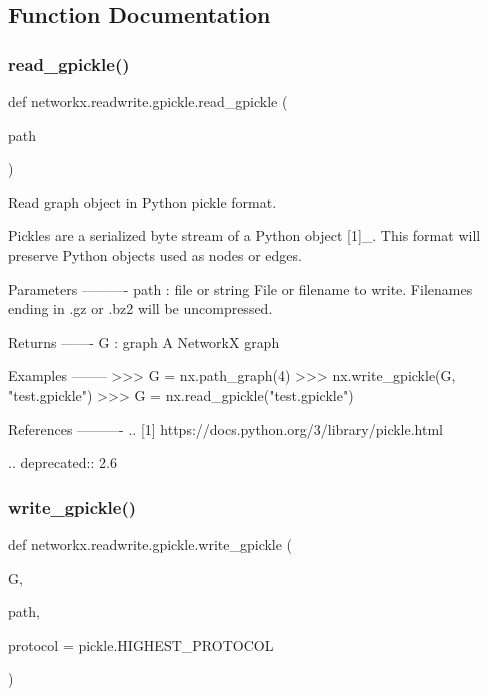\subsection{Function Documentation}
\mbox{\label{namespacenetworkx_1_1readwrite_1_1gpickle_a733db274ef3b0b0eb420eb3c5949cbee}} 
\subsubsection{\texorpdfstring{read\+\_\+gpickle()}{read\_gpickle()}}
{\footnotesize\ttfamily def networkx.\+readwrite.\+gpickle.\+read\+\_\+gpickle (\begin{DoxyParamCaption}\item[{}]{path }\end{DoxyParamCaption})}

\begin{DoxyVerb}Read graph object in Python pickle format.

Pickles are a serialized byte stream of a Python object [1]_.
This format will preserve Python objects used as nodes or edges.

Parameters
----------
path : file or string
   File or filename to write.
   Filenames ending in .gz or .bz2 will be uncompressed.

Returns
-------
G : graph
   A NetworkX graph

Examples
--------
>>> G = nx.path_graph(4)
>>> nx.write_gpickle(G, "test.gpickle")
>>> G = nx.read_gpickle("test.gpickle")

References
----------
.. [1] https://docs.python.org/3/library/pickle.html

.. deprecated:: 2.6
\end{DoxyVerb}
 \mbox{\label{namespacenetworkx_1_1readwrite_1_1gpickle_a58e61477e773f922a302f97374b2880e}} 
\subsubsection{\texorpdfstring{write\+\_\+gpickle()}{write\_gpickle()}}
{\footnotesize\ttfamily def networkx.\+readwrite.\+gpickle.\+write\+\_\+gpickle (\begin{DoxyParamCaption}\item[{}]{G,  }\item[{}]{path,  }\item[{}]{protocol = {\ttfamily pickle.HIGHEST\+\_\+PROTOCOL} }\end{DoxyParamCaption})}


